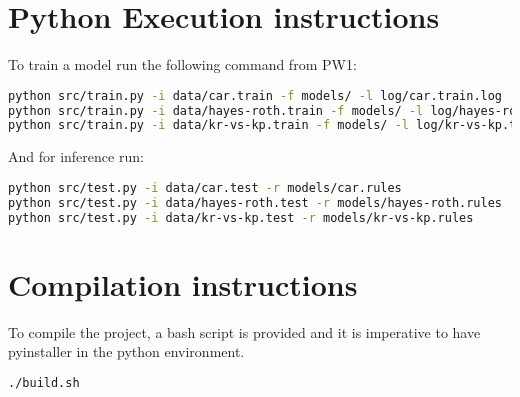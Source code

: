 \section{Python Execution instructions}

To train a model run the following command from PW1:

\begin{lstlisting}[language=bash]
python src/train.py -i data/car.train -f models/ -l log/car.train.log
python src/train.py -i data/hayes-roth.train -f models/ -l log/hayes-roth.train.log
python src/train.py -i data/kr-vs-kp.train -f models/ -l log/kr-vs-kp.train.log
\end{lstlisting}

And for inference run:
\begin{lstlisting}[language=bash]
python src/test.py -i data/car.test -r models/car.rules
python src/test.py -i data/hayes-roth.test -r models/hayes-roth.rules
python src/test.py -i data/kr-vs-kp.test -r models/kr-vs-kp.rules
\end{lstlisting}

\section{Compilation instructions}

To compile the project, a bash script  is provided and it is imperative to have pyinstaller in the python environment.

\begin{lstlisting}[language=bash]
./build.sh
\end{lstlisting}


